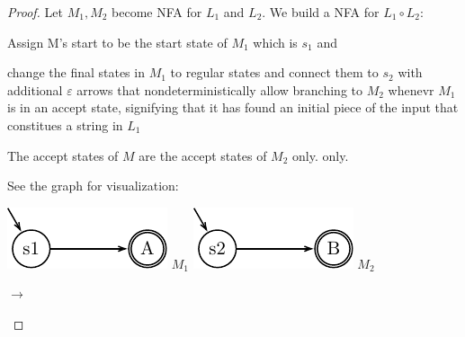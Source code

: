 \begin{example}
    \begin{proof}
        Let $M_1, M_2$ become NFA for $L_1$ and $L_2$.
        We build a NFA for $L_1 \circ L_2$:
        \begin{compactenum}
        \item Assign M's start to be the start state of $M_1$ which is $s_1$ and
        \item change the final states in $M_1$ to regular states and connect them to $s_2$
            with additional $\varepsilon$ arrows that nondeterministically allow branching
            to $M_2$ whenevr $M_1$ is in an accept state, signifying that it has found an
            initial piece of the input that constitues a string in $L_1$
        \item The accept states of $M$ are the accept states of $M_2$ only. only.
        \end{compactenum}
        See the graph for visualization:
        \begin{center}
            \begin{minipage}{4cm}
                \includegraphics[width=\textwidth]{pics/mp/nfa-4.pdf}
                \center $M_1$
                \includegraphics[width=\textwidth]{pics/mp/nfa-5.pdf}
                \center $M_2$
            \end{minipage}
            \; $\longrightarrow$ \;
            \begin{minipage}{4cm}

\end{minipage}
\end{center}
\end{proof}
\end{example}
